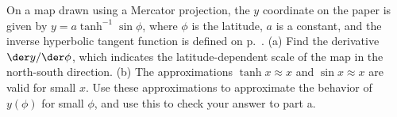 On a map drawn using a Mercator projection, the $y$ coordinate on the paper
is given by $y=a \tanh^{-1}\sin\phi$, where $\phi$ is the latitude, $a$
is a constant, and the inverse hyperbolic tangent function is defined on
p.~\pageref{def-hyperbolic}. (a) Find the derivative $\der y/\der\phi$, which indicates the
latitude-dependent scale of the map in the north-south direction.
(b) The approximations $\tanh x\approx x$ and $\sin x\approx x$ are valid for small $x$.
Use these approximations to approximate the behavior of $y(\phi)$ for small $\phi$,
and use this to check your answer to part a.
\answercheck
